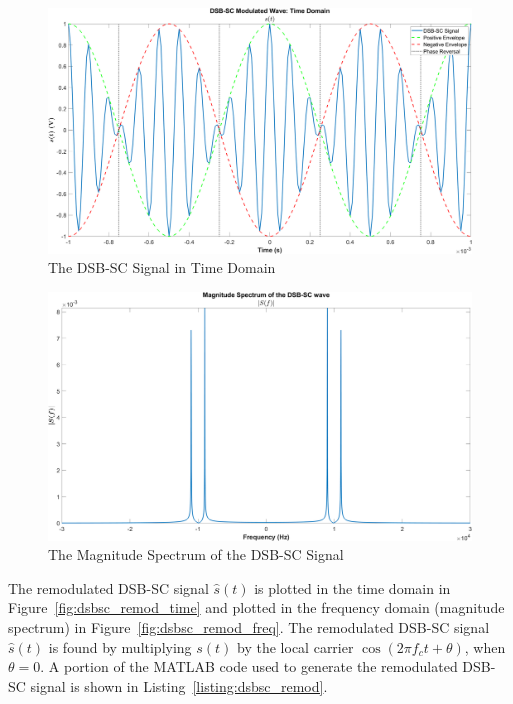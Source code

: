 \documentclass[12pt]{article}
\begin{document}
\begin{figure}[h]
    \centering
    \includegraphics[width=\textwidth]{dsbsc_time}
    \caption{\label{fig:dsbsc_time}The DSB-SC Signal in Time Domain}
\end{figure}
\begin{figure}[h]
    \centering
    \includegraphics[width=\textwidth]{dsbsc_freq}
    \caption{\label{fig:dsbsc_freq}The Magnitude Spectrum of the DSB-SC Signal}
\end{figure} \clearpage

The remodulated DSB-SC signal $\hat{s}(t)$ is plotted in the time domain in Figure~\ref{fig:dsbsc_remod_time} and plotted in the frequency domain (magnitude spectrum) in Figure~\ref{fig:dsbsc_remod_freq}. The remodulated DSB-SC signal $\hat{s}(t)$ is found by multiplying $s(t)$ by the local carrier $\cos(2 \pi f_c t + \theta)$, when $\theta = 0$. A portion of the MATLAB code used to generate the remodulated DSB-SC signal is shown in Listing~\ref{listing:dsbsc_remod}.


\end{document}
